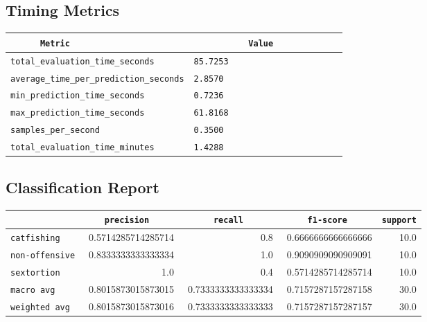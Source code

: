 \documentclass{article}
\begin{document}
\subsection{Timing Metrics}

\begin{center}
\begin{tabular}{l | l} \hline
    \verb|      Metric     | & \verb|           Value           | \\ \hline
    \hline
    \verb|total_evaluation_time_seconds| & \verb|85.7253                      | \\ \hline
    \verb|average_time_per_prediction_seconds| & \verb|2.8570                       | \\ \hline
    \verb|min_prediction_time_seconds| & \verb|0.7236                       | \\ \hline
    \verb|max_prediction_time_seconds| & \verb|61.8168                      | \\ \hline
    \verb|samples_per_second| & \verb|0.3500                       | \\ \hline
    \verb|total_evaluation_time_minutes| & \verb|1.4288                       | \\ \hline
\end{tabular}
\end{center}

\subsection{Classification Report}

\begin{center}
\begin{tabular}{l | r | r | r | r} \hline
    \verb|            | & \verb|    precision     | & \verb|      recall      | & \verb|     f1-score     | & \verb|support| \\ \hline
    \hline
    \verb|catfishing | & 0.5714285714285714 & 0.8 & 0.6666666666666666 &    10.0 \\ \hline
    \verb|non-offensive| & 0.8333333333333334 & 1.0 & 0.9090909090909091 &    10.0 \\ \hline
    \verb|sextortion | & 1.0 & 0.4 & 0.5714285714285714 &    10.0 \\ \hline
    \verb|macro avg  | & 0.8015873015873015 & 0.7333333333333334 & 0.7157287157287158 &    30.0 \\ \hline
    \verb|weighted avg| & 0.8015873015873016 & 0.7333333333333333 & 0.7157287157287157 &    30.0 \\ \hline
\end{tabular}
\end{center}
\end{document}
